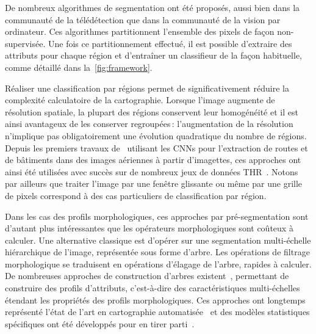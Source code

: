 De nombreux algorithmes de segmentation ont été proposés, aussi bien dans la communauté de la télédétection que dans la communauté de la vision par ordinateur. Ces algorithmes partitionnent l'ensemble des pixels de façon non-supervisée. Une fois ce partitionnement effectué, il est possible d'extraire des attributs pour chaque région et d'entraîner un classifieur de la façon habituelle, comme détaillé dans la~\cref{fig:framework}.

Réaliser une classification par régions permet de significativement réduire la complexité calculatoire de la cartographie. Lorsque l'image augmente de résolution spatiale, la plupart des régions conservent leur homogénéité et il est ainsi avantageux de les conserver regroupées\,: l'augmentation de la résolution n'implique pas obligatoirement une évolution quadratique du nombre de régions. Depuis les premiers travaux de~\citet{mnih_machine_2013} utilisant les \glspl{CNN} pour l'extraction de routes et de bâtiments dans des images aériennes à partir d'imagettes, ces approches ont ainsi été utilisées avec succès sur de nombreux jeux de données \gls{THR}~\cite{lagrange_benchmarking_2015,vargas_superpixel-based_2014}. Notons par ailleurs que traiter l'image par une fenêtre glissante ou même par une grille de pixels correspond à des cas particuliers de classification par région.

Dans les cas des profils morphologiques, ces approches par pré-segmentation sont d'autant plus intéressantes que les opérateurs morphologiques sont coûteux à calculer. Une alternative classique est d'opérer sur une segmentation multi-échelle hiérarchique de l'image, représentée sous forme d'arbre. Les opérations de filtrage morphologique se traduisent en opérations d'élagage de l'arbre, rapides à calculer. De nombreuses approches de construction d'arbres existent~\cite{bosilj_indexation_2016}, permettant de construire des profils d'attributs, c'est-à-dire des caractéristiques multi-échelles étendant les propriétés des profils morphologiques. Ces approches ont longtemps représenté l'état de l'art en cartographie automatisée~\cite{pham_feature_2018} et des modèles statistiques spécifiques ont été développés pour en tirer parti~\cite{cui_combining_2016}.

